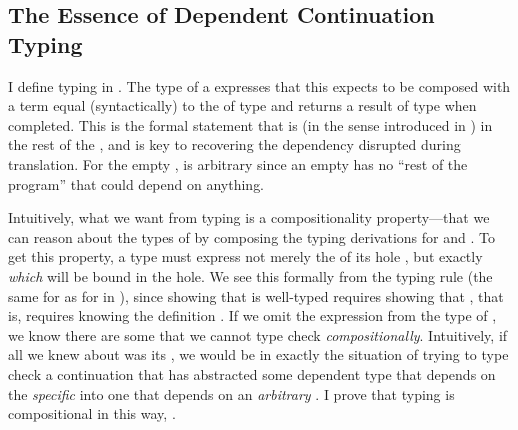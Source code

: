 \subsection{The Essence of Dependent Continuation Typing}
\FigECCAStackTypes
I define  typing in .
The type \im{(\tN : \tA) \Rightarrow \tB} of a  expresses that this
 expects to be composed with a term equal (syntactically) to the
 \im{\tN} of type \im{\tA} and returns a
result of type \im{\tB} when completed.
This is the formal statement that \im{\tN} is  (in the sense
introduced in ) in the rest of the , and
is key to recovering the dependency disrupted during  translation.
For the empty  \im{\hole}, \im{\tN} is arbitrary since an empty
 has no ``rest of the program'' that could depend on anything.

Intuitively, what we want from  typing is a compositionality
property---that we can reason about the types of
 \im{\tK\hw{\tN}} by composing the typing
derivations for \im{\tK} and \im{\tN}.
To get this property, a  type must express not merely the
\emph{} of its hole \im{\tA}, but exactly \emph{which }
\im{\tN} will be bound in the hole.
We see this formally from the typing rule  (the same for \tlang as
for \slang in ), since showing that
\im{\tlete{\ty}{\tN}{\tM}} is well-typed requires showing that \im{\ty = \tN
  \vdash \tM}, that is, requires knowing the definition \im{\ty = \tN}.
If we omit the expression \im{\tN} from the type of , we know there
are some  \im{\tK\hw{\tN}} that we cannot type check
\emph{compositionally}.
Intuitively, if all we knew about \im{\ty} was its , we would be in
exactly the situation of trying to type check a continuation that has
abstracted some dependent type that depends on the \emph{specific} \im{\tN} into
one that depends on an \emph{arbitrary} \im{\ty}.
I prove that  typing is compositional in this way,
.

